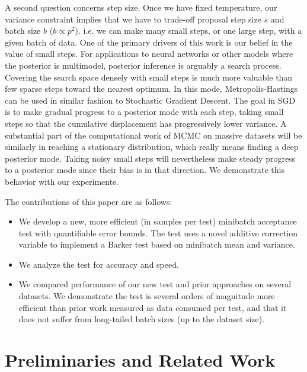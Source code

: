 \documentclass{article}
\begin{document}
A second question concerns step size. Once we have fixed temperature,
our variance constraint implies that we have to trade-off proposal
step size $s$ and batch size $b$ ($b \propto p^2$). i.e. we can make
many small steps, or one large step, with a given batch of data. One
of the primary drivers of this work is our belief in the value of
small steps. For applications to neural networks or other models where
the posterior is multimodel, posterior inference is arguably a search
process. Covering the search space densely with small steps is much
more valuable than few sparse steps toward the nearest optimum. In
this mode, Metropolis-Hastings can be used in similar fashion to
Stochastic Gradient Descent. The goal in SGD is to make gradual
progress to a posterior mode with each step, taking small steps so
that the cumulative displacement has progressively lower variance. A
substantial part of the computational work of MCMC on massive datasets
will be similarly in reaching a stationary distribution, which really
means finding a deep posterior mode. Taking noisy small steps will
nevertheless make steady progress to a posterior mode since their bias
is in that direction. We demonstrate this behavior with our experiments. 


The contributions of this paper are as follows:

\begin{itemize}
\item We develop a new, more efficient (in samples per test) minibatch acceptance test with quantifiable error bounds. The test
  uses a novel additive correction variable to implement a Barker test based on minibatch mean and variance. 
\item We analyze the test for accuracy and speed.
\item We compared performance of our new test and prior approaches on several datasets. We demonstrate the test is several orders
  of magnitude more efficient than prior work measured as data consumed per test, and that it does not suffer
  from long-tailed batch sizes (up to the dataset size). 
\end{itemize}




\section{Preliminaries and Related Work}\label{sec:related_work}
\end{document}
